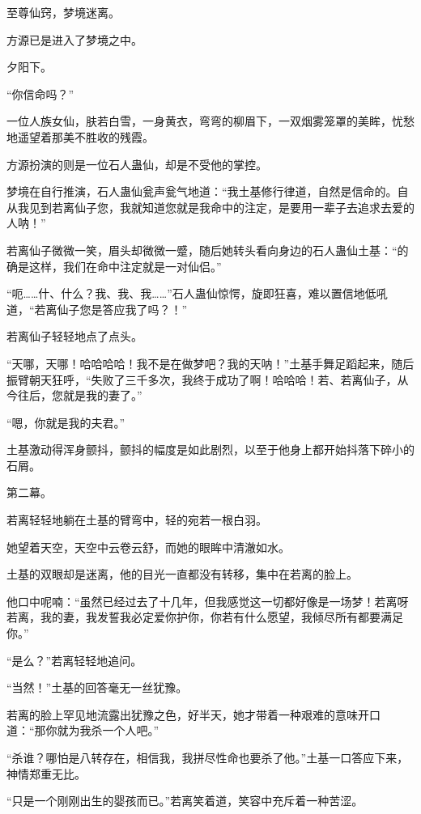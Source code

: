 
\begin{this_body}

至尊仙窍，梦境迷离。

方源已是进入了梦境之中。

夕阳下。

“你信命吗？”

一位人族女仙，肤若白雪，一身黄衣，弯弯的柳眉下，一双烟雾笼罩的美眸，忧愁地遥望着那美不胜收的残霞。

方源扮演的则是一位石人蛊仙，却是不受他的掌控。

梦境在自行推演，石人蛊仙瓮声瓮气地道：“我土基修行律道，自然是信命的。自从我见到若离仙子您，我就知道您就是我命中的注定，是要用一辈子去追求去爱的人呐！”

若离仙子微微一笑，眉头却微微一蹙，随后她转头看向身边的石人蛊仙土基：“的确是这样，我们在命中注定就是一对仙侣。”

“呃……什、什么？我、我、我……”石人蛊仙惊愕，旋即狂喜，难以置信地低吼道，“若离仙子您是答应我了吗？！”

若离仙子轻轻地点了点头。

“天哪，天哪！哈哈哈哈！我不是在做梦吧？我的天呐！”土基手舞足蹈起来，随后振臂朝天狂呼，“失败了三千多次，我终于成功了啊！哈哈哈！若、若离仙子，从今往后，您就是我的妻了。”

“嗯，你就是我的夫君。”

土基激动得浑身颤抖，颤抖的幅度是如此剧烈，以至于他身上都开始抖落下碎小的石屑。

第二幕。

若离轻轻地躺在土基的臂弯中，轻的宛若一根白羽。

她望着天空，天空中云卷云舒，而她的眼眸中清澈如水。

土基的双眼却是迷离，他的目光一直都没有转移，集中在若离的脸上。

他口中呢喃：“虽然已经过去了十几年，但我感觉这一切都好像是一场梦！若离呀若离，我的妻，我发誓我必定爱你护你，你若有什么愿望，我倾尽所有都要满足你。”

“是么？”若离轻轻地追问。

“当然！”土基的回答毫无一丝犹豫。

若离的脸上罕见地流露出犹豫之色，好半天，她才带着一种艰难的意味开口道：“那你就为我杀一个人吧。”

“杀谁？哪怕是八转存在，相信我，我拼尽性命也要杀了他。”土基一口答应下来，神情郑重无比。

“只是一个刚刚出生的婴孩而已。”若离笑着道，笑容中充斥着一种苦涩。


\end{this_body}

